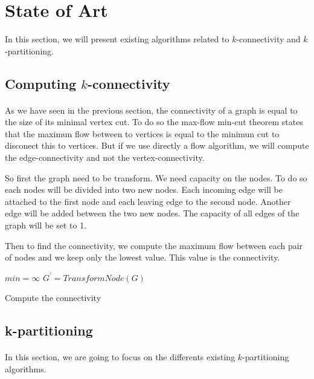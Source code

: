 \section{State of Art}
In this section, we will present existing algorithms related to
$k$-connectivity and $k$-partitioning.

\subsection{Computing $k$-connectivity}
\paragraph{}
As we have seen in the previous section, the connectivity of a graph is equal to
the size of its minimal vertex cut.
To do so the max-flow min-cut theorem states that the maximun flow between to
vertices is equal to the minimun cut to disconect this to vertices.
But if we use directly a flow algorithm, we will compute the edge-connectivity
and not the vertex-connectivity.

So first the graph need to be transform. We need capacity on the nodes. To do so
each nodes will be divided into two new nodes. Each incoming edge will be
attached to the first node and each leaving edge to the second node. Another
edge will be added between the two new nodes.
The capacity of all edges of the graph will be set to 1.

Then to find the connectivity, we compute the maximum flow between each pair of
nodes and we keep only the lowest value. This value is the connectivity.


\begin{algorithm}[!h]
    $min = \infty$\;
    $G^{'} = TransformNode(G)$\;
    \;
    \caption{Compute the connectivity}
\end{algorithm}

\subsection{k-partitioning}
\paragraph{}
In this section, we are going to focus on the differents existing
$k$-partitioning algorithms.

